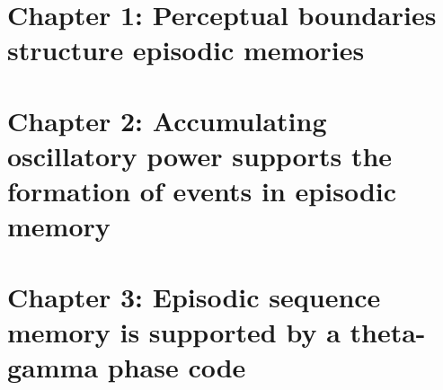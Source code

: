\documentclass[fancyheaders,chapterformata]{thesis}
\author{Andrew Charles Heusser}
\begin{document}
\maketitlepages

\begin{dedication}

\end{dedication}

\begin{acknowledgments}

\end{acknowledgments}

\begin{new-abstract}

\end{new-abstract}

\clearpage
\tableofcontents

\lofTOC
\lotTOC
\clearpage
\begin{introduction}

\end{introduction}

\chapter{Chapter 1: Perceptual boundaries structure episodic memories}


\chapter{Chapter 2: Accumulating oscillatory power supports the formation of events in episodic memory}


\chapter{Chapter 3: Episodic sequence memory is supported by a theta-gamma phase code}


\begin{conclusion}

\end{conclusion}



\printbibliography
\end{document}
